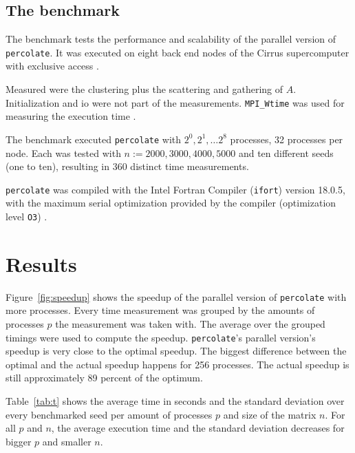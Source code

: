 \documentclass[twoside,11pt]{article}
\def\perc{\texttt{perco\-late}}
\begin{document}


\subsection{The benchmark}
\label{subsec:bench}

The benchmark tests the performance and scalability of the
parallel version of \perc{}.
It was executed on eight back end nodes of the Cirrus
supercomputer with exclusive access \citep[see][]{cirrus}.

Measured were the clustering plus the scattering and
gathering of $A$.
Initialization and io were not part of the measurements.
\texttt{MPI\_Wtime} was used for measuring the execution
time \citep[see][Chapter 8]{mpi}.

The benchmark executed \perc{} with $2^0,2^1,\dots2^8$
processes, 32 processes per node.
Each was tested with $n := 2000, 3000, 4000, 5000$
and ten different seeds (one to ten), resulting in 360
distinct time measurements.

\perc{} was compiled with the Intel Fortran Compiler
(\texttt{ifort}) version 18.0.5, with the maximum serial
optimization provided by the compiler (optimization level
\texttt{O3}) \citep[see][]{ifort}.



\section{Results} %

Figure~\ref{fig:speedup} shows the speedup of the parallel
version of \perc{} with more processes.
Every time measurement was grouped by the amounts of
processes $p$ the measurement was taken with.
The average over the grouped timings were used to compute
the speedup.
\perc{}'s parallel version's speedup is very close to the
optimal speedup.
The biggest difference between the optimal and the actual
speedup happens for 256 processes.
The actual speedup is still approximately 89 percent of the
optimum.

Table~\ref{tab:t} shows the average time in seconds and
the standard deviation over every benchmarked seed per
amount of processes $p$ and size of the matrix $n$.
For all $p$ and $n$, the average execution time and the
standard deviation decreases for bigger $p$ and smaller
$n$.
\end{document}
